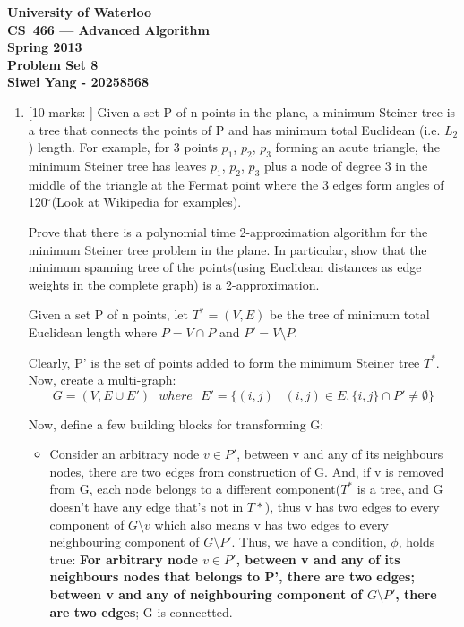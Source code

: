 \documentclass[12pt]{article}
\begin{document}
\begin{center}
\large\bf University of Waterloo\\
CS~466 --- Advanced Algorithm\\
Spring 2013\\
Problem Set 8\\
Siwei Yang - 20258568\\
\end{center}
\bigskip

\begin{enumerate}

\item{} [10 marks: ]
Given a set P of n points in the plane, a minimum Steiner tree is a tree that connects the points of P and has minimum total Euclidean (i.e. $L_{2}$) length. For example, for 3 points $p_{1}$, $p_{2}$, $p_{3}$ forming an acute triangle, the minimum Steiner tree has leaves $p_{1}$, $p_{2}$, $p_{3}$ plus a node of degree 3 in the middle of the triangle at the Fermat point where the 3 edges form angles of 120$^\circ$(Look at Wikipedia for examples).

Prove that there is a polynomial time 2-approximation algorithm for the minimum Steiner tree problem in the plane. In particular, show that the minimum spanning tree of the points(using Euclidean distances as edge weights in the complete graph) is a 2-approximation.

Given a set P of n points, let $T^{*} = (V, E)$ be the tree of minimum total Euclidean length where $P = V \cap P$ and $P' = V \setminus P$.

Clearly, P' is the set of points added to form the minimum Steiner tree $T^{*}$. Now, create a multi-graph:
\begin{equation}
G = (V, E \cup E') \text{ } where \text{ } E' = \{ (i, j) \mid (i, j) \in E, \{i, j\} \cap P' \neq \emptyset \}
\end{equation}

Now, define a few building blocks for transforming G:
\begin{itemize}
\item{} Consider an arbitrary node $v \in P'$, between v and any of its neighbours nodes, there are two edges from construction of G. And, if v is removed from G, each node belongs to a different component($T^{*}$ is a tree, and G doesn't have any edge that's not in $T{*}$), thus v has two edges to every component of $G \setminus v$ which also means v has two edges to every neighbouring component of $G \setminus P'$. Thus, we have a condition, $\phi$, holds true: \textbf{For arbitrary node $v \in P'$, between v and any of its neighbours nodes that belongs to P', there are two edges; between v and any of neighbouring component of $G \setminus P'$, there are two edges}; G is connectted.


\end{itemize}
\end{enumerate}
\end{document}
